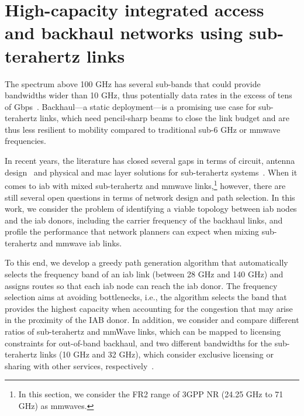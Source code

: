 
\newcommand{\red}[1]{\begin{color}{red}#1\end{color}}

\section{High-capacity integrated access and backhaul networks using sub-terahertz links}
\label{sec:iab-wons}

The spectrum above 100 GHz has several sub-bands that could provide bandwidths wider than 10 GHz, thus potentially data rates in the excess of tens of Gbps~\cite{akyildiz2014terahertz}. Backhaul---a static deployment---is a promising use case for sub-terahertz links, which need pencil-sharp beams to close the link budget and are thus less resilient to mobility compared to traditional sub-6 GHz or \gls{mmwave} frequencies. 

In recent years, the literature has closed several gaps in terms of circuit, antenna design~\cite{singh2020design} and physical and \gls{mac} layer solutions for sub-terahertz systems~\cite{ghafoor2020mac}.
%
When it comes to \gls{iab} with mixed sub-terahertz and \gls{mmwave} links,\footnote{In this section, we consider the FR2 range of 3GPP NR (24.25 GHz to 71 GHz) as \glspl{mmwave}.} however, there are still several open questions in terms of network design and path selection. In this work, we consider the problem of identifying a viable topology between \gls{iab} nodes and the \gls{iab} donors, including the carrier frequency of the backhaul links, and profile the performance that network planners can expect when mixing sub-terahertz and \gls{mmwave} \gls{iab} links.

To this end, we develop a greedy path generation algorithm that automatically selects the frequency band of an \gls{iab} link (between 28 GHz and 140 GHz) and assigns routes so that each \gls{iab} node can reach the \gls{iab} donor. The frequency selection aims at avoiding bottlenecks, i.e., the algorithm selects the band that provides the highest capacity when accounting for the congestion that may arise in the proximity of the IAB donor. In addition, we consider and compare different ratios of sub-terahertz and mmWave links, which can be mapped to licensing constraints for out-of-band backhaul, and two different bandwidths for the sub-terahertz links (10 GHz and 32 GHz), which consider exclusive licensing or sharing with other services, respectively~\cite{polese2022dynamic}.

